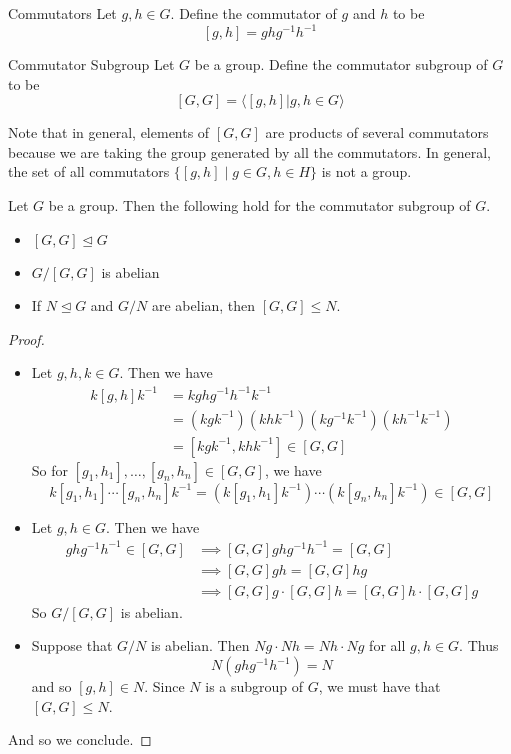 \documentclass[a4paper]{article}
\begin{document}
\begin{defn}{Commutators}{} Let $g,h\in G$. Define the commutator of $g$ and $h$ to be $$[g,h]=ghg^{-1}h^{-1}$$
\end{defn}

\begin{defn}{Commutator Subgroup}{} Let $G$ be a group. Define the commutator subgroup of $G$ to be $$[G,G]=\langle [g,h]|g,h\in G\rangle$$
\end{defn}

Note that in general, elements of $[G,G]$ are products of several commutators because we are taking the group generated by all the commutators. In general, the set of all commutators $\{[g,h]\;|\;g\in G, h\in H\}$ is not a group. 

\begin{prp}{}{} Let $G$ be a group. Then the following hold for the commutator subgroup of $G$. 
\begin{itemize}
\item $[G,G]\trianglelefteq G$
\item $G/[G,G]$ is abelian
\item If $N\trianglelefteq G$ and $G/N$ are abelian, then $[G,G]\leq N$. 
\end{itemize} 
\begin{proof}~\\
\begin{itemize}
\item Let $g,h,k\in G$. Then we have 
\begin{align*}
k[g,h]k^{-1}&=kghg^{-1}h^{-1}k^{-1}\\
&=\left(kgk^{-1}\right)\left(khk^{-1}\right)\left(kg^{-1}k^{-1}\right)\left(kh^{-1}k^{-1}\right)\\
&=[kgk^{-1},khk^{-1}]\in[G,G]
\end{align*}
So for $[g_1,h_1],\dots,[g_n,h_n]\in[G,G]$, we have $$k[g_1,h_1]\cdots[g_n,h_n]k^{-1}=\left(k[g_1,h_1]k^{-1}\right)\cdots\left(k[g_n,h_n]k^{-1}\right)\in[G,G]$$
\item Let $g,h\in G$. Then we have 
\begin{align*}
ghg^{-1}h^{-1}\in[G,G]&\implies [G,G]ghg^{-1}h^{-1}=[G,G]\\
&\implies [G,G]gh=[G,G]hg\\
&\implies [G,G]g\cdot[G,G]h=[G,G]h\cdot[G,G]g
\end{align*}
So $G/[G,G]$ is abelian. 
\item Suppose that $G/N$ is abelian. Then $Ng\cdot Nh=Nh\cdot Ng$ for all $g,h\in G$. Thus $$N(ghg^{-1}h^{-1})=N$$ and so $[g,h]\in N$. Since $N$ is a subgroup of $G$, we must have that $[G,G]\leq N$. 
\end{itemize}
And so we conclude. 
\end{proof}
\end{prp}
\end{document}
